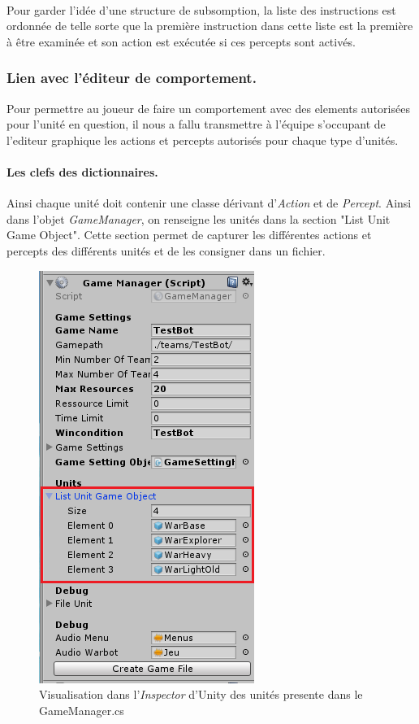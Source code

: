 \documentclass{report}
\begin{document}
\paragraph{}Pour garder l'idée d'une structure de subsomption, la liste des instructions est ordonnée de telle sorte que la première instruction dans cette liste est la première à être examinée et son action est exécutée si ces percepts sont activés.
\subsubsection{Lien avec l'éditeur de comportement.}
Pour permettre au joueur de faire un comportement avec des elements autorisées pour l'unité en question, il nous a fallu transmettre à l'équipe s'occupant de l'editeur graphique les actions et percepts autorisés pour chaque type d'unités.
\paragraph{Les clefs des dictionnaires.} Ainsi chaque unité doit contenir une classe dérivant d'\textit{Action} et de \textit{Percept}.
Ainsi dans l'objet \textit{GameManager}, on renseigne les unités dans la section "List Unit Game Object". Cette section permet de capturer les différentes actions et percepts des différents unités et de les consigner dans un fichier.
\begin{figure}[!h]
\centering
\includegraphics{GameManagerImage}
\caption{Visualisation dans l'\textit{Inspector} d'Unity des unités presente dans le GameManager.cs}
\end{figure}
\end{document}
